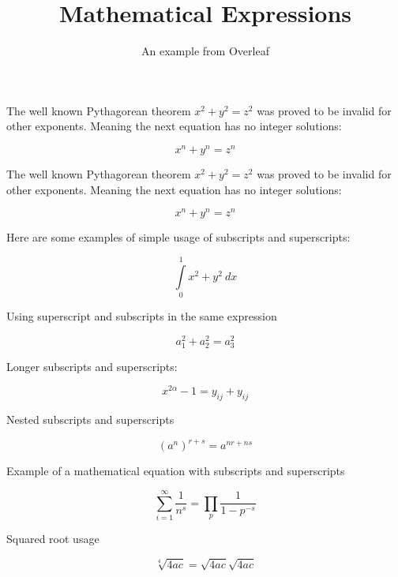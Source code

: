 \documentclass{article}
\title{Mathematical Expressions}
\author{An example from Overleaf}
\begin{document}
\maketitle

The well known Pythagorean theorem $x^2 + y^2 = z^2$ was
proved to be invalid for other exponents.
Meaning the next equation has no integer solutions:

$$ x^n + y^n = z^n $$

The well known Pythagorean theorem \(x^2 + y^2 = z^2\) was
proved to be invalid for other exponents.
Meaning the next equation has no integer solutions:

\[ x^n + y^n = z^n \]

Here are some examples of simple usage of subscripts and superscripts:

\[ \int\limits_0^1 x^2 + y^2 \ dx \]

\vspace{1cm}

Using superscript and subscripts in the same expression

\[ a_1^2 + a_2^2 = a_3^2 \]

\vspace{1cm}

Longer subscripts and superscripts:

\[ x^{2 \alpha} - 1 = y_{ij} + y_{ij}  \]

\vspace{1cm}

Nested subscripts and superscripts

\[ (a^n)^{r+s} = a^{nr+ns} \]

\vspace{1cm}

Example of a mathematical equation with subscripts and superscripts

\[ \sum_{i=1}^{\infty} \frac{1}{n^s} = \prod_p \frac{1}{1 - p^{-s}} \]


\vspace{1cm}

Squared root usage

\[ \sqrt[4]{4ac} = \sqrt{4ac}\sqrt{4ac} \]
\end{document}
